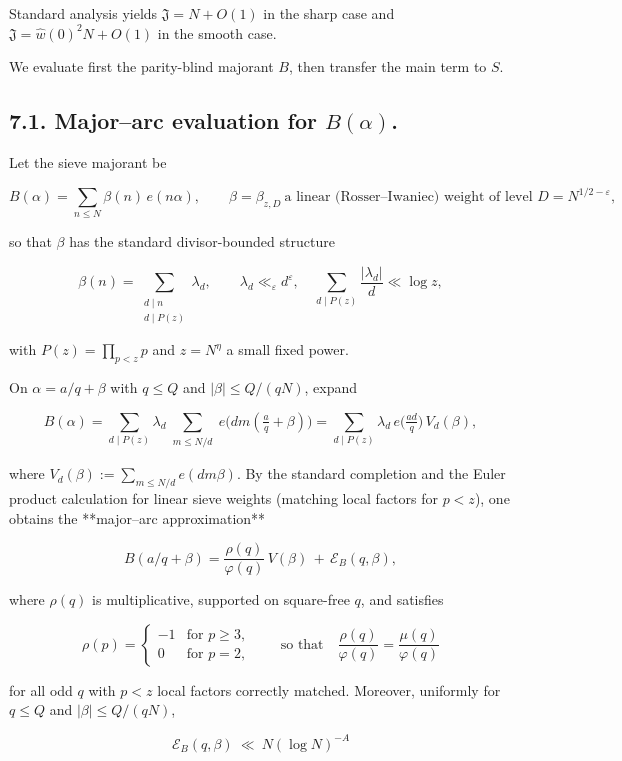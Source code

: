\documentclass[11pt]{article}
\theoremstyle{definition}
\theoremstyle{remark}
\begin{document}
Standard analysis yields $\mathfrak J=N+O(1)$ in the sharp case and $\mathfrak J=\widehat w(0)^2 N+O(1)$ in the smooth case.

We evaluate first the parity-blind majorant $B$, then transfer the main term to $S$.

\subsection*{7.1. Major–arc evaluation for $B(\alpha)$.}

Let the sieve majorant be

$$
B(\alpha)=\sum_{n\le N}\beta(n)\,e(n\alpha),\qquad 
\beta=\beta_{z,D}\ \text{a linear (Rosser–Iwaniec) weight of level }D=N^{1/2-\varepsilon},
$$

so that $\beta$ has the standard divisor-bounded structure

$$
\beta(n)=\sum_{\substack{d\mid n\\ d\mid P(z)}}\lambda_d,\qquad 
\lambda_d\ll_\varepsilon d^\varepsilon,\quad \sum_{d\mid P(z)}\frac{|\lambda_d|}{d}\ll \log z,
$$

with $P(z)=\prod_{p<z}p$ and $z=N^{\eta}$ a small fixed power.

On $\alpha=a/q+\beta$ with $q\le Q$ and $|\beta|\le Q/(qN)$, expand

$$
B(\alpha)=\sum_{d\mid P(z)}\lambda_d
\sum_{\substack{m\le N/d}} e\!\big(dm(\tfrac aq+\beta)\big)
=\sum_{d\mid P(z)}\lambda_d\, e\!\big(\tfrac{ad}{q}\big)\,V_d(\beta),
$$

where $V_d(\beta):=\sum_{m\le N/d}e(dm\beta)$. By the standard completion and the Euler product calculation for linear sieve weights (matching local factors for $p<z$), one obtains the **major–arc approximation**

$$
B(a/q+\beta)=\frac{\rho(q)}{\varphi(q)}\,V(\beta)\,+\,\mathcal E_B(q,\beta),
$$

where $\rho(q)$ is multiplicative, supported on square-free $q$, and satisfies

$$
\rho(p)=
\begin{cases}
-1& \text{for } p\ge 3,\\
0 & \text{for } p=2,
\end{cases}
\qquad\text{so that}\quad \frac{\rho(q)}{\varphi(q)}=\frac{\mu(q)}{\varphi(q)}
$$

for all odd $q$ with $p<z$ local factors correctly matched. Moreover, uniformly for $q\le Q$ and $|\beta|\le Q/(qN)$,

$$
\mathcal E_B(q,\beta)\ \ll\ N(\log N)^{-A}
$$
\end{document}
